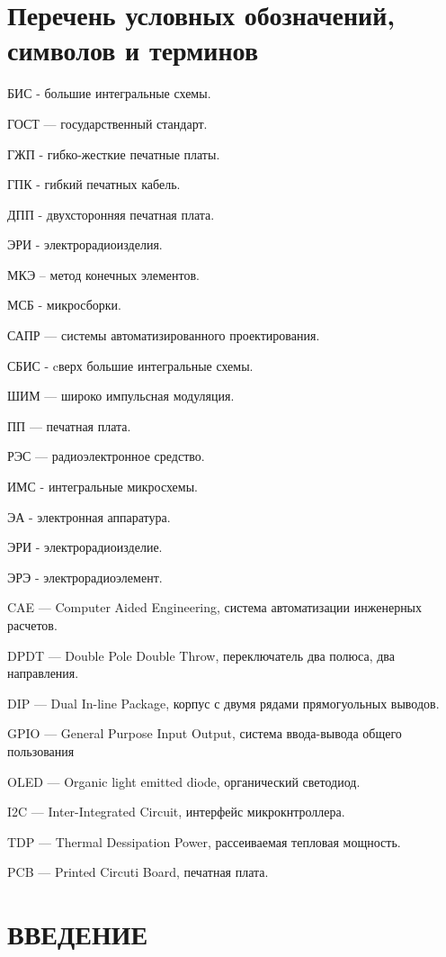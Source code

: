 \tableofcontents
\newpage


\section*{Перечень условных обозначений, символов и терминов}



БИС - большие интегральные схемы.

ГОСТ — государственный стандарт.

ГЖП - гибко-жесткие печатные платы.

ГПК - гибкий печатных кабель.

ДПП - двухсторонняя печатная плата.

ЭРИ - электрорадиоизделия.

МКЭ – метод конечных элементов.

МСБ - микросборки.

САПР — системы автоматизированного проектирования.

СБИС - cверх большие интегральные схемы.

ШИМ — широко импульсная модуляция.

ПП — печатная плата.

РЭС — радиоэлектронное средство.

ИМС - интегральные микросхемы.

ЭА - электронная аппаратура.

ЭРИ - электрорадиоизделие.

ЭРЭ - электрорадиоэлемент.

CAE — Computer Aided Engineering, система автоматизации инженерных расчетов.

DPDT — Double Pole Double Throw, переключатель два полюса, два направления.

DIP — Dual In-line Package, корпус с двумя рядами
прямогуольных выводов.

GPIO — General Purpose Input Output, система ввода-вывода общего пользования

OLED — Organic light emitted diode, органический светодиод.

I2C — Inter-Integrated Circuit, интерфейс микрокнтроллера.

TDP — Thermal Dessipation Power, рассеиваемая тепловая мощность.

PCB — Printed Circuti Board, печатная плата.

\newpage

\section*{ВВЕДЕНИЕ}

